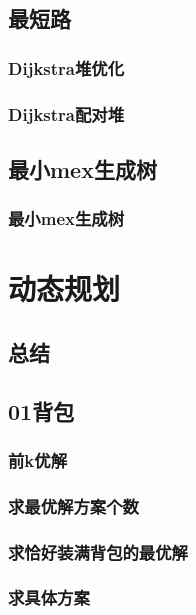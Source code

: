 \documentclass[10pt,a4paper]{article}
\begin{document}
\subsection{最短路}
\subsubsection{Dijkstra堆优化}

\subsubsection{Dijkstra配对堆}

\subsection{最小mex生成树}
\subsubsection{最小mex生成树}

\section{动态规划}
\subsection{总结}

\subsection{01背包}
\subsubsection{前k优解}

\subsubsection{求最优解方案个数}

\subsubsection{求恰好装满背包的最优解}

\subsubsection{求具体方案}

\end{document}
